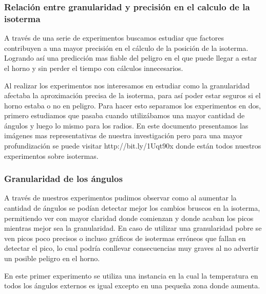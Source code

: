 \subsubsection{Relación entre granularidad y precisión en el calculo de la isoterma}
A través de una serie de experimentos buscamos estudiar que factores contribuyen a una mayor precisión en el cálculo de la posición de la isoterma. Logrando así una predicción mas fiable del peligro en el que puede llegar a estar el horno y sin perder el tiempo con cálculos innecesarios.


Al realizar los experimentos nos interesamos en estudiar como la granularidad afectaba la aproximación precisa de la isoterma, para así poder estar seguros si el horno estaba o no en peligro. Para hacer esto separamos los experimentos en dos, primero estudiamos que pasaba cuando utilizábamos una mayor cantidad de ángulos y luego lo mismo para los radios. En este documento presentamos las imágenes mas representativas de nuestra investigación pero para una mayor profundización se puede visitar http://bit.ly/1Uqt90x donde están todos nuestros experimentos sobre isotermas.

\subsubsection{Granularidad de los ángulos}

A través de nuestros experimentos pudimos observar como al aumentar la cantidad de ángulos se podían detectar mejor los cambios bruscos en la isoterma, permitiendo ver con mayor claridad donde comienzan y donde acaban los picos mientras mejor sea la granularidad. En caso de utilizar una granularidad pobre se ven picos poco precisos o incluso gráficos de isotermas erróneos que fallan en detectar el pico, lo cual podría conllevar consecuencias muy graves al no advertir un posible peligro en el horno.

En este primer experimento se utiliza una instancia en la cual la temperatura en todos los ángulos externos es igual excepto en una pequeña zona donde aumenta.


